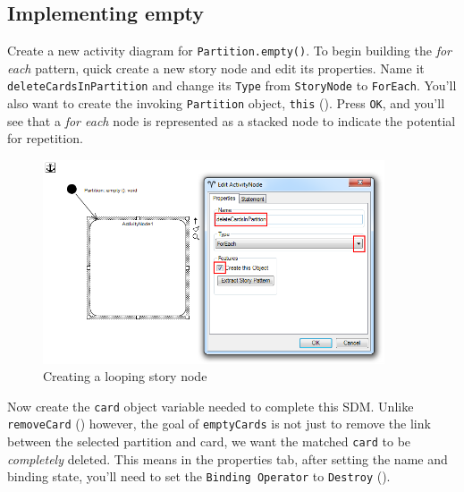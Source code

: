 \newpage
\hypertarget{emptyPartition vis}{}
\subsection{Implementing empty}
\genHeader

\begin{stepbystep}

\item Create a new activity diagram for \texttt{Partition.empty()}. To begin building the \emph{for each} pattern, quick create a new
story node and edit its properties. Name it \texttt{deleteCardsInPartition} and change its \texttt{Type} from \texttt{StoryNode} to \texttt{ForEach}. You'll
also want to create the invoking \texttt{Partition} object, \texttt{this} (). Press \texttt{OK}, and you'll see that a \emph{for each}
node is represented as a stacked node to indicate the potential for repetition.

\begin{figure}[htbp]
\begin{center}
  \includegraphics[width=0.9\textwidth]{../../org.moflon.doc.handbook.03_storyDiagrams/06_emptyPartition/visEPImages/ea_sdmEmptyNew}
  \caption{Creating a looping story node}  
  \label{ea:sdm_foreach}
\end{center}
\end{figure}

\item Now create the \texttt{card} object variable needed to complete this SDM. Unlike \texttt{removeCard}
() however, the goal of \texttt{emptyCards} is not just to remove the link between the selected partition and card, we
want the matched \texttt{card} to be \emph{completely} deleted. This means in the properties tab, after setting the name and binding state, you'll need to set
the \texttt{Binding Operator} to \texttt{Destroy} ().


\end{stepbystep}

